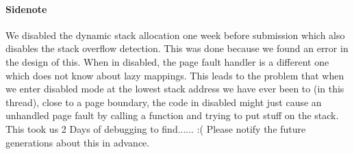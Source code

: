 \paragraph{Sidenote}
We disabled the dynamic stack allocation one week before submission which also disables the stack overflow detection. This was done because we found an error in the design of this. When in disabled, the page fault handler is a different one which does not know about lazy mappings. This leads to the problem that when we enter disabled mode at the lowest stack address we have ever been to (in this thread), close to a page boundary, the code in disabled might just cause an unhandled page fault by calling a function and trying to put stuff on the stack. This took us 2 Days of debugging to find...... :( Please notify the future generations about this in advance.


